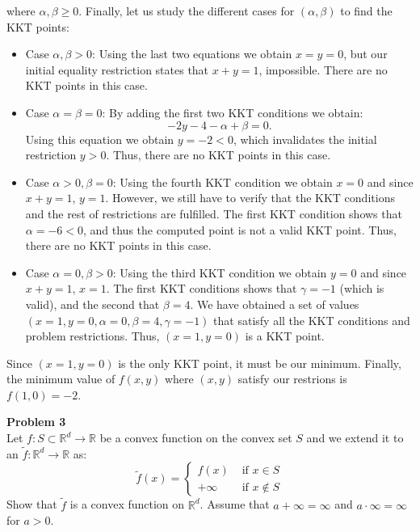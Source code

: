 \documentclass[11pt,table]{article}
\newcommand{\R}{\mathbb{R}}
\newenvironment{problem}[2][Problem]
{ \begin{mdframed}[backgroundcolor=gray!20] \textbf{#1 #2} \\ }
	{  \end{mdframed} }
\begin{document}
	where \(\alpha, \beta \ge 0\). Finally, let us study the different cases for \((\alpha,\beta)\) to find the KKT points:
	
	\begin{itemize}
		\item Case \(\alpha, \beta > 0\): Using the last two equations we obtain \(x = y = 0\), but our initial equality restriction states that \(x + y = 1\), impossible. There are no KKT points in this case.
		\item Case \(\alpha = \beta = 0\): By adding the first two KKT conditions we obtain:
		\begin{equation}
			\label{eq2-1}
			-2y -4 - \alpha + \beta = 0.
		\end{equation}
		Using this equation we obtain \(y = -2 < 0\), which invalidates the initial restriction \(y > 0\). Thus, there are no KKT points in this case.
		\item Case \(\alpha > 0, \beta = 0\): Using the fourth KKT condition we obtain \(x=0\) and since \(x + y = 1\), \(y=1\). However, we still have to verify that the KKT conditions and the rest of restrictions are fulfilled. The first KKT condition shows that \(\alpha = -6 < 0\), and thus the computed point is not a valid KKT point. Thus, there are no KKT points in this case.
		\item Case \(\alpha = 0, \beta > 0\): Using the third KKT condition we obtain \(y=0\) and since \(x + y = 1\), \(x=1\). The first KKT conditions shows that \(\gamma = -1\) (which is valid), and the second that \(\beta = 4\). We have obtained a set of values \((x=1, y=0, \alpha=0, \beta=4, \gamma = -1)\) that satisfy all the KKT conditions and problem restrictions. Thus, \((x=1, y=0)\) is a KKT point.
	\end{itemize}
	
	Since \((x=1, y=0)\) is the only KKT point, it must be our minimum. Finally, the minimum value of \(f(x,y)\) where \((x,y)\) satisfy our restrions is \(f(1,0) = -2\). \\
	
	\begin{problem}{3}
		Let \(f: S \subset \R^d \to \R\) be a convex function on the convex set \(S\) and we extend it to an \(\tilde f : \R^d \to \R\) as:
		\[
		\tilde f(x) = \begin{cases}
			f(x) & \text{ if } x \in S\\
			+\infty & \text{ if } x \notin S 
		\end{cases}
		\]
		Show that \(\tilde f\) is a convex function on \(\R^d\). Assume that \(a+\infty = \infty\) and \(a\cdot \infty = \infty\) for \(a > 0\).
	\end{problem}
	
\end{document}
